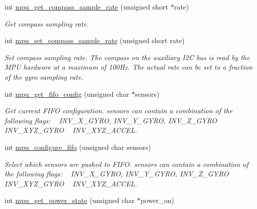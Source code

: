 \begin{DoxyCompactItemize}
int \hyperlink{group___d_r_i_v_e_r_s_gab5a45cd7783f6937788c0decb0b18b16}{mpu\+\_\+get\+\_\+compass\+\_\+sample\+\_\+rate} (unsigned short $\ast$rate)
\begin{DoxyCompactList}\small\item\em Get compass sampling rate. \end{DoxyCompactList}\item 
int \hyperlink{group___d_r_i_v_e_r_s_ga78da3828de0ef9d080c4d03e7bc45e7b}{mpu\+\_\+set\+\_\+compass\+\_\+sample\+\_\+rate} (unsigned short rate)
\begin{DoxyCompactList}\small\item\em Set compass sampling rate. The compass on the auxiliary I2C bus is read by the M\+PU hardware at a maximum of 100\+Hz. The actual rate can be set to a fraction of the gyro sampling rate. \end{DoxyCompactList}\item 
int \hyperlink{group___d_r_i_v_e_r_s_ga093f11eb10b2639a4b9fe344ea348c54}{mpu\+\_\+get\+\_\+fifo\+\_\+config} (unsigned char $\ast$sensors)
\begin{DoxyCompactList}\small\item\em Get current F\+I\+FO configuration. {\itshape sensors} can contain a combination of the following flags\+: ~\newline
 I\+N\+V\+\_\+\+X\+\_\+\+G\+Y\+RO, I\+N\+V\+\_\+\+Y\+\_\+\+G\+Y\+RO, I\+N\+V\+\_\+\+Z\+\_\+\+G\+Y\+RO ~\newline
 I\+N\+V\+\_\+\+X\+Y\+Z\+\_\+\+G\+Y\+RO ~\newline
 I\+N\+V\+\_\+\+X\+Y\+Z\+\_\+\+A\+C\+C\+EL. \end{DoxyCompactList}\item 
int \hyperlink{group___d_r_i_v_e_r_s_gababbdda287e1f19323489f90a0889dd7}{mpu\+\_\+configure\+\_\+fifo} (unsigned char sensors)
\begin{DoxyCompactList}\small\item\em Select which sensors are pushed to F\+I\+FO. {\itshape sensors} can contain a combination of the following flags\+: ~\newline
 I\+N\+V\+\_\+\+X\+\_\+\+G\+Y\+RO, I\+N\+V\+\_\+\+Y\+\_\+\+G\+Y\+RO, I\+N\+V\+\_\+\+Z\+\_\+\+G\+Y\+RO ~\newline
 I\+N\+V\+\_\+\+X\+Y\+Z\+\_\+\+G\+Y\+RO ~\newline
 I\+N\+V\+\_\+\+X\+Y\+Z\+\_\+\+A\+C\+C\+EL. \end{DoxyCompactList}\item 
int \hyperlink{group___d_r_i_v_e_r_s_gaec8fa7a067988d174516bb735a4a0bc9}{mpu\+\_\+get\+\_\+power\+\_\+state} (unsigned char $\ast$power\+\_\+on)

\end{DoxyCompactItemize}
